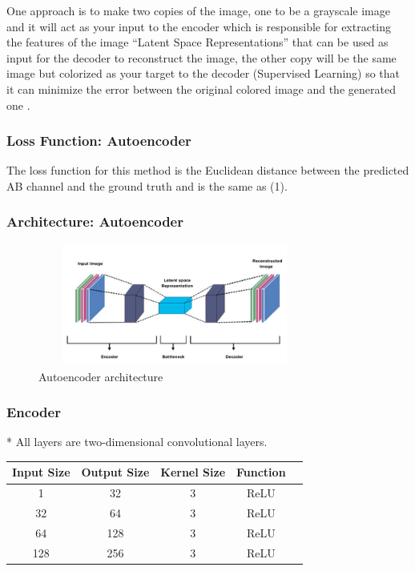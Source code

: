 \documentclass{article}
\begin{document}
One approach is to make two copies of the image, one to be a grayscale image and it will act as your input to the encoder which is responsible for extracting the features of the image 
“Latent Space Representations” that can be used as input for the decoder to reconstruct the image, the other copy will be the same image but colorized as your target to the decoder (Supervised Learning) so that it can minimize the error between the original colored image and the generated one \cite{4}.



\subsubsection{Loss Function: Autoencoder}
The loss function for this method is the Euclidean distance between the predicted AB channel and the ground truth and is the same as (1).


\subsubsection{Architecture: Autoencoder}


\begin{figure}[htbp!]
    \centering
        \includegraphics[width=9cm, height=4cm]{autoencoder.jpg}
        \caption{Autoencoder architecture}
    \end{figure}

\subsubsection{Encoder}
* All layers are two-dimensional convolutional layers.

\begin{center}
\begin{tabular}{ |c|c|c|c|c| } 
\hline
Input Size & Output Size & Kernel Size & Function  \\
\hline
1 & 32 & 3 & ReLU \\ 
32 & 64 & 3 & ReLU  \\ 
64 & 128 & 3 & ReLU \\ 
128 & 256 & 3 & ReLU \\ 

\hline
\end{tabular}
\end{center}
\end{document}
